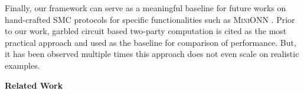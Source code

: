 Finally, our framework \tool can serve as a meaningful baseline for future works on hand-crafted SMC protocols for specific functionalities such as \textsc{MiniONN} \cite{minionn}. 
Prior to our work, garbled circuit based two-party computation is cited as the most practical approach and used as the baseline for comparison of performance. But, it has been observed multiple times this approach does not even scale on realistic examples.





%
%
%
%
%
%
%
%
%
%




\vspace{10pt}

\noindent\textbf{Related Work} 


\newpage